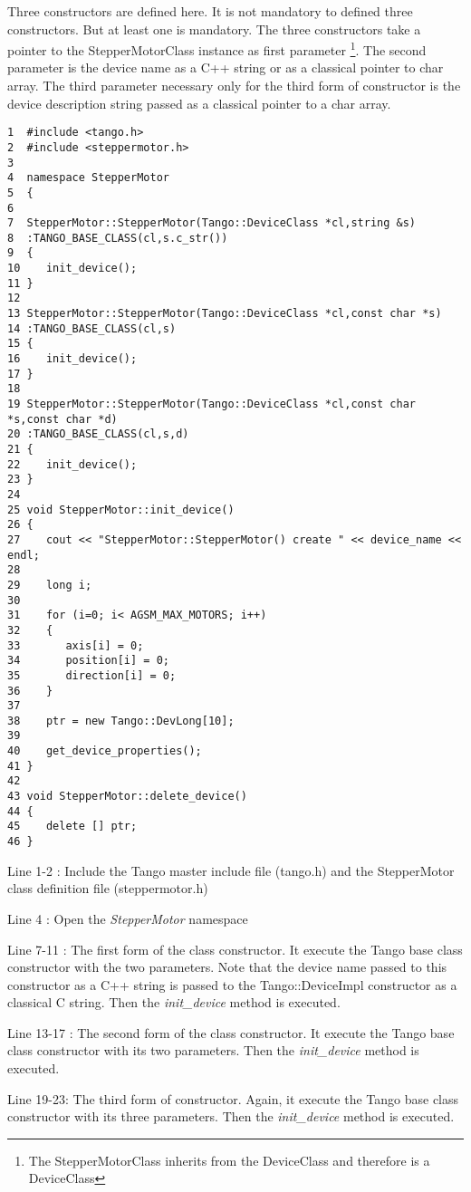 Three constructors are defined here. It is not mandatory to defined
three constructors. But at least one is mandatory. The three constructors
take a pointer to the StepperMotorClass instance as first parameter%
\footnote{The StepperMotorClass inherits from the DeviceClass and therefore
is a DeviceClass%
}. The second parameter is the device name as a C++ string or as a
classical pointer to char array. The third parameter necessary only
for the third form of constructor is the device description string
passed as a classical pointer to a char array.


\begin{verbatim}
1  #include <tango.h>
2  #include <steppermotor.h>
3 
4  namespace StepperMotor
5  {
6 
7  StepperMotor::StepperMotor(Tango::DeviceClass *cl,string &s)
8  :TANGO_BASE_CLASS(cl,s.c_str())
9  {
10    init_device();
11 }
12 
13 StepperMotor::StepperMotor(Tango::DeviceClass *cl,const char *s)
14 :TANGO_BASE_CLASS(cl,s)
15 {
16    init_device();
17 }
18 
19 StepperMotor::StepperMotor(Tango::DeviceClass *cl,const char *s,const char *d)
20 :TANGO_BASE_CLASS(cl,s,d)
21 {
22    init_device();
23 }
24 
25 void StepperMotor::init_device()
26 {
27    cout << "StepperMotor::StepperMotor() create " << device_name << endl;
28 
29    long i;
30 
31    for (i=0; i< AGSM_MAX_MOTORS; i++)
32    {
33       axis[i] = 0;
34       position[i] = 0;
35       direction[i] = 0;
36    }
37 
38    ptr = new Tango::DevLong[10];
39 
40    get_device_properties();
41 }
42 
43 void StepperMotor::delete_device()
44 {
45    delete [] ptr;
46 }
\end{verbatim}


Line 1-2 : Include the Tango master include file (tango.h) and the
StepperMotor class definition file (steppermotor.h)

Line 4 : Open the \emph{StepperMotor} namespace

Line 7-11 : The first form of the class constructor. It execute the
Tango base class constructor with the two parameters. Note that the
device name passed to this constructor as a C++ string is passed to
the Tango::DeviceImpl constructor as a classical
C string. Then the \emph{init\_device} method
is executed.

Line 13-17 : The second form of the class constructor. It execute
the Tango base class constructor with its two parameters. Then the
\emph{init\_device} method is executed.

Line 19-23: The third form of constructor. Again, it execute the Tango
base class constructor with its three parameters. Then the \emph{init\_device}
method is executed.

